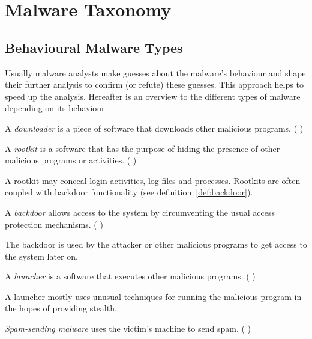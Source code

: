 \chapter{Malware Taxonomy} \label{chap:classification}

\section{Behavioural Malware Types}

Usually malware analysts make guesses about the malware's behaviour and shape their further analysis to confirm (or refute) these guesses. This approach helps to speed up the analysis. \cite[]{sikorski12} Hereafter is an overview to the different types of malware depending on its behaviour.

\begin{definition}[Downloader]
A \emph{downloader} is a piece of software that downloads other malicious programs. (\cf{} \cite[]{sikorski12})
\end{definition} 

\begin{definition}[Rootkit]
A \emph{rootkit} is a software that has the purpose of hiding the presence of other malicious programs or activities. (\cf{} \cite[]{sikorski12})
\end{definition} 

A rootkit may conceal login activities, log files and processes.
Rootkits are often coupled with backdoor functionality (see definition~\ref{def:backdoor}).

\begin{definition}[Backdoor]
A \emph{backdoor} allows access to the system by circumventing the usual access protection mechanisms. (\cf{} \cite[]{sikorski12}) \label{def:backdoor}
\end{definition} 

The backdoor is used by the attacker or other malicious programs to get access to the system later on.

\begin{definition}[Launcher]
A \emph{launcher} is a software that executes other malicious programs. (\cf{} \cite[]{sikorski12})
\end{definition} 

A launcher mostly uses unusual techniques for running the malicious program in the hopes of providing stealth.

\begin{definition}
\emph{Spam-sending malware} uses the victim's machine to send spam. (\cf{} \cite[]{sikorski12}) \label{def:spam}
\end{definition}

